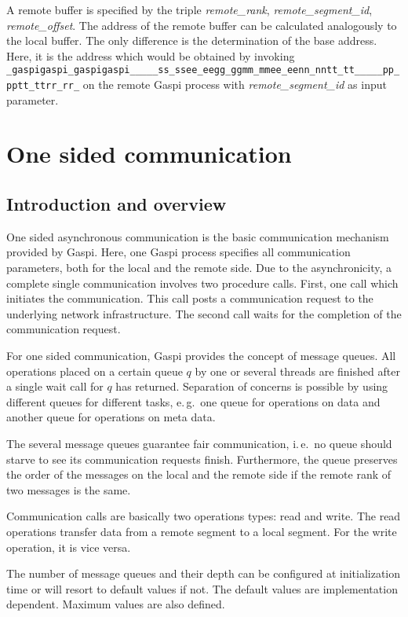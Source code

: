 \documentclass{article}
\makeatletter
\newlength{\st}\setlength{\st}{0pt}
\newcommand{\zerowsep}{\hskip 0pt plus 0.1pt minus 0.1pt}
\newcommand{\ZSEP}[1]{\ifx#1\@@@EOZ@@@\let\next\relax\else\ifx#1\_#1\zerowsep\else#1\fi\let\next\ZSEP\fi\next}
\newcommand{\zsep}[1]{\ZSEP{}#1\@@@EOZ@@@}
\newcommand{\gaspiprefix}{gaspi}
\newcommand{\GASPI}{{\sc Gaspi}}
\newcommand{\function}[1]{{\tt #1}}
\newcommand{\parameter}[1]{{\it #1}}
\newcommand{\gaspifunction}[1]{\function{\protect\zsep{\gaspiprefix\_#1}}}
\makeatother
\begin{document}
A remote buffer is specified by the triple \parameter{remote\_rank}, \parameter{remote\_segment\_id},
\parameter{remote\_offset}.
The address of the remote  buffer can be calculated analogously to the local buffer. The only
difference is the determination of the base address. Here, it is the address
which would be obtained by invoking \gaspifunction{segment\_ptr}
on the remote \GASPI{} process with \parameter{remote\_segment\_id} as input parameter.

\section{One sided communication}

\subsection{Introduction and overview}

One sided asynchronous communication is the basic communication
mechanism provided by \GASPI{}. Here, one \GASPI{} process specifies
all communication parameters, both for the local and the remote
side. Due to the asynchronicity, a complete single communication
involves two procedure calls. First, one call which initiates the
communication.  This call posts a communication request to the
underlying network infrastructure.  The second call waits for the
completion of the communication request.

For one sided communication, \GASPI{} provides the concept of message
queues.  All operations placed on a certain queue $q$ by one or
several threads are finished after a single wait call for $q$ has
returned. Separation of concerns is possible by using different queues
for different tasks, e.\,g.\ one queue for operations on data and
another queue for operations on meta data.

The several message queues guarantee fair communication, i.\,e.\ no queue
should starve to see its communication requests finish. Furthermore,
the queue preserves the order of the messages on the local and the
remote side if the remote rank of two messages is the same.

Communication calls are basically two operations types: read and write.
The read operations transfer data from a remote segment
to a local segment.
For the write operation, it is vice versa.

The number of message queues and their depth can be configured at initialization
time or will resort to default values if not. The default values are implementation
dependent. Maximum values are also defined.
\end{document}

